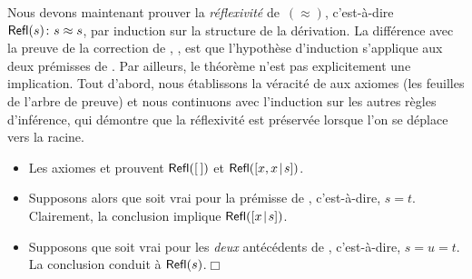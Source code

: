 Nous devons maintenant prouver la \emph{réflexivité} de~\((\approx)\),
c'est-à-dire \(\textsf{Refl}({s}) \colon s
\approx s\), par induction sur la structure
de la dérivation. La différence avec la preuve de la correction de
, , est que
l'hypothèse d'induction s'applique aux deux prémisses de
. Par ailleurs, le théorème n'est pas explicitement une
implication. Tout d'abord, nous établissons la véracité de
 aux axiomes (les feuilles de l'arbre de preuve) et
nous continuons avec l'induction sur les autres règles d'inférence,
qui démontre que la réflexivité est préservée lorsque l'on se déplace
vers la racine.
\begin{itemize}

  \item Les axiomes  et  prouvent
    \(\textsf{Refl}({[\,]})\) et \(\textsf{Refl}({[{x,x}\!\mid\!{s}]})\).

  \item Supposons alors que  soit vrai pour la prémisse
    de , c'est-à-dire, \(s = t\). Clairement, la
    conclusion implique \(\textsf{Refl}({[{x}\!\mid\!{s}]})\).

  \item Supposons que  soit vrai pour les \emph{deux}
    antécédents de , c'est-à-dire, \(s=u=t\). La
    conclusion conduit à
    \(\textsf{Refl}({s})\).\hfill\(\Box\)

\end{itemize}

